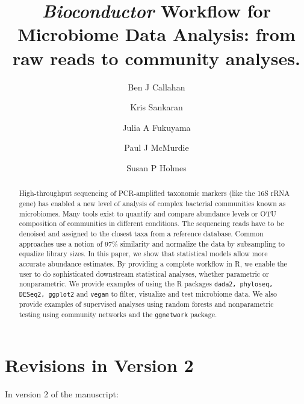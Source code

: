 \documentclass[9pt,a4paper]{extarticle}\usepackage[]{graphicx}\usepackage[]{color}
\begin{document}
\pagestyle{front}

\title{\textit{Bioconductor} Workflow for Microbiome Data Analysis: from raw reads to community analyses.}
\author[1]{Ben J Callahan}
\author[1]{Kris Sankaran}
\author[1]{Julia A Fukuyama}
\author[2]{Paul J McMurdie}
\author[1*]{Susan P Holmes}


\maketitle \thispagestyle{front}

\begin{abstract}
High-throughput sequencing of PCR-amplified taxonomic markers
(like the 16S rRNA gene)
has enabled a new level of analysis of
complex bacterial communities known as microbiomes.  Many tools exist
to quantify and compare abundance levels or OTU composition of
communities in different conditions.  The sequencing reads have to be
denoised and assigned to the closest taxa from a reference
database. Common approaches use a notion of 97\% similarity and
normalize the data by subsampling to equalize library sizes.  In this
paper, we show that statistical models allow more accurate abundance
estimates. By providing a complete workflow in R, we enable the user
to do sophisticated downstream statistical analyses, whether
parametric or nonparametric. We provide examples of using the  R
packages {\tt dada2, phyloseq, DESeq2, ggplot2} and {\tt vegan} to filter, visualize and
test microbiome data. We also provide examples of supervised analyses using random
forests and nonparametric testing using community networks and the {\tt ggnetwork}
package.
\end{abstract}
\section*{Revisions in Version 2}
In version 2 of the manuscript:
\end{document}
